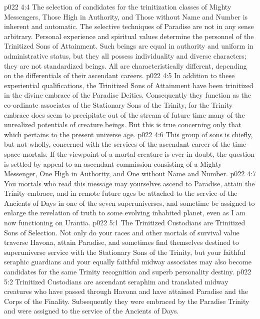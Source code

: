 \vs p022 4:4 \pc The selection of candidates for the trinitization classes of Mighty Messengers, Those High in Authority, and Those without Name and Number is inherent and automatic. The selective techniques of Paradise are not in any sense arbitrary. Personal experience and spiritual values determine the personnel of the Trinitized Sons of Attainment. Such beings are equal in authority and uniform in administrative status, but they all possess individuality and diverse characters; they are not standardized beings. All are characteristically different, depending on the differentials of their ascendant careers.
\vs p022 4:5 In addition to these experiential qualifications, the Trinitized Sons of Attainment have been trinitized in the divine embrace of the Paradise Deities. Consequently they function as the co\hyp{}ordinate associates of the Stationary Sons of the Trinity, for the Trinity embrace does seem to precipitate out of the stream of future time many of the unrealized potentials of creature beings. But this is true concerning only that which pertains to the present universe age.
\vs p022 4:6 This group of sons is chiefly, but not wholly, concerned with the services of the ascendant career of the time\hyp{}space mortals. If the viewpoint of a mortal creature is ever in doubt, the question is settled by appeal to an ascendant commission consisting of a Mighty Messenger, One High in Authority, and One without Name and Number.
\vs p022 4:7 You mortals who read this message may yourselves ascend to Paradise, attain the Trinity embrace, and in remote future ages be attached to the service of the Ancients of Days in one of the seven superuniverses, and sometime be assigned to enlarge the revelation of truth to some evolving inhabited planet, even as I am now functioning on Urantia.
\vs p022 5:1 The Trinitized Custodians are Trinitized Sons of Selection. Not only do your races and other mortals of survival value traverse Havona, attain Paradise, and sometimes find themselves destined to superuniverse service with the Stationary Sons of the Trinity, but your faithful seraphic guardians and your equally faithful midway associates may also become candidates for the same Trinity recognition and superb personality destiny.
\vs p022 5:2 Trinitized Custodians are ascendant seraphim and translated midway creatures who have passed through Havona and have attained Paradise and the Corps of the Finality. Subsequently they were embraced by the Paradise Trinity and were assigned to the service of the Ancients of Days.
